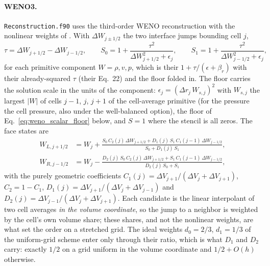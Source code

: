 \paragraph{WENO3.}
\texttt{Reconstruction.f90} uses the third-order WENO reconstruction with the
nonlinear weights of \citet{Yamaleev2009}.  With
$\Delta W_{j\pm1/2}$ the two interface jumps bounding cell $j$,
%
\begin{equation}
  \tau = \Delta W_{j+1/2} - \Delta W_{j-1/2},\qquad
  S_0 = 1 + \frac{\tau^2}{\Delta W_{j+1/2}^2 + \epsilon_j},\qquad
  S_1 = 1 + \frac{\tau^2}{\Delta W_{j-1/2}^2 + \epsilon_j},
  \label{eq:weno_weights}
\end{equation}
%
for each primitive component $W = \rho, v, p$, which is their
$1 + \tau/(\epsilon + \beta_r)$ with their already-squared $\tau$ (their
Eq.~22) and the floor folded in.  The floor carries the solution scale in
the units of the component: $\epsilon_j = (\Delta r_j\,W_{s,j})^2$ with
$W_{s,j}$ the largest $|W|$ of cells $j-1$, $j$, $j+1$ of the cell-average
primitive (for the pressure the cell pressure, also under the well-balanced
option), the floor of Eq.~\eqref{eq:weno_scalar_floor} below, and $S=1$ where
the stencil is all zeros.  The face states are
%
\begin{equation}
  \begin{aligned}
    W_{L,j+1/2} &= W_j + \frac{S_0\,C_2(j)\,\Delta W_{j+1/2}
                    + D_1(j)\,S_1\,C_1(j-1)\,\Delta W_{j-1/2}}
                   {S_0 + D_1(j)\,S_1},\\
    W_{R,j-1/2} &= W_j - \frac{D_2(j)\,S_0\,C_2(j)\,\Delta W_{j+1/2}
                    + S_1\,C_1(j-1)\,\Delta W_{j-1/2}}
                   {D_2(j)\,S_0 + S_1},
  \end{aligned}
  \label{eq:weno_faces}
\end{equation}
%
with the purely geometric coefficients
$C_1(j) = \Delta V_{j+1}/(\Delta V_j + \Delta V_{j+1})$, $C_2 = 1 - C_1$,
$D_1(j) = \Delta V_{j+1}/(\Delta V_j + \Delta V_{j-1})$ and
$D_2(j) = \Delta V_{j-1}/(\Delta V_j + \Delta V_{j+1})$.  Each candidate is
the linear interpolant of two cell averages \emph{in the volume coordinate},
so the jump to a neighbor is weighted by the cell's own volume share; these
shares, and not the nonlinear weights, are what set the order on a stretched
grid.  The ideal weights $d_0 = 2/3$, $d_1 = 1/3$ of the uniform-grid scheme
enter only through their ratio, which is what $D_1$ and $D_2$ carry: exactly
$1/2$ on a grid uniform in the volume coordinate and $1/2 + O(h)$ otherwise.

